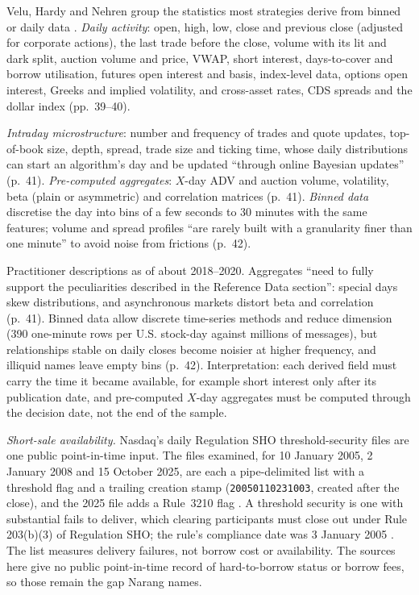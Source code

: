 \begin{qfdata}\label{data:derived-market-statistics}
 Velu, Hardy and Nehren group the statistics most strategies derive from binned or daily data \citep[chap.~1, sec.~1.4.3, pp.~39--42]{s3-velu}. \emph{Daily activity}: open, high, low, close and previous close (adjusted for corporate actions), the last trade before the close, volume with its lit and dark split, auction volume and price, VWAP, short interest, days-to-cover and borrow utilisation, futures open interest and basis, index-level data, options open interest, Greeks and implied volatility, and cross-asset rates, CDS spreads and the dollar index (pp.~39--40).

\emph{Intraday microstructure}: number and frequency of trades and quote updates, top-of-book size, depth, spread, trade size and ticking time, whose daily distributions can start an algorithm's day and be updated ``through online Bayesian updates'' (p.~41). \emph{Pre-computed aggregates}: $X$-day ADV and auction volume, volatility, beta (plain or asymmetric) and correlation matrices (p.~41). \emph{Binned data} discretise the day into bins of a few seconds to 30 minutes with the same features; volume and spread profiles ``are rarely built with a granularity finer than one minute'' to avoid noise from frictions (p.~42).

 Practitioner descriptions as of about 2018--2020. Aggregates ``need to fully support the peculiarities described in the Reference Data section'': special days skew distributions, and asynchronous markets distort beta and correlation (p.~41). Binned data allow discrete time-series methods and reduce dimension (390 one-minute rows per U.S. stock-day against millions of messages), but relationships stable on daily closes become noisier at higher frequency, and illiquid names leave empty bins (p.~42). Interpretation: each derived field must carry the time it became available, for example short interest only after its publication date, and pre-computed $X$-day aggregates must be computed through the decision date, not the end of the sample.

\emph{Short-sale availability.} Nasdaq's daily Regulation SHO threshold-security files are one public point-in-time input. The files examined, for 10 January 2005, 2 January 2008 and 15 October 2025, are each a pipe-delimited list with a threshold flag and a trailing creation stamp (\texttt{20050110231003}, created after the close), and the 2025 file adds a Rule~3210 flag \citep[files \texttt{nasdaqth20050110}, \texttt{nasdaqth20080102} and \texttt{nasdaqth20251015}]{nasdaq-regsho-threshold}. A threshold security is one with substantial fails to deliver, which clearing participants must close out under Rule 203(b)(3) of Regulation SHO; the rule's compliance date was 3 January 2005 \citep[Discussion]{finra-ntm-04-93}. The list measures delivery failures, not borrow cost or availability. The sources here give no public point-in-time record of hard-to-borrow status or borrow fees, so those remain the gap Narang names.


\end{qfdata}
